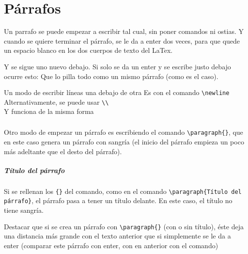 \chapter{Párrafos}

Un parrafo se puede empezar a escribir tal cual, sin poner comandos ni ostias. Y cuando se quiere terminar el párrafo, se le da a enter dos veces, para que quede un espacio blanco en los dos cuerpos de texto del LaTex.

Y se sigue uno nuevo debajo.
Si solo se da un enter y se escribe justo debajo ocurre esto:
Que lo pilla todo como un mismo párrafo (como es el caso).

Un modo de escribir líneas una debajo de otra \newline
Es con el comando \verb!\newline! \newline
Alternativamente, se puede usar \verb!\\! \\
Y funciona de la misma forma

\paragraph{}Otro modo de empezar un párrafo es escribiendo el comando \verb!\paragraph{}!, que en este caso genera un párrafo con sangría (el inicio del párrafo empieza un poco más adeltante que el desto del párrafo).

\paragraph{Título del párrafo}Si se rellenan los \verb!{}! del comando, como en el comando \verb!\paragraph{Título del párrafo}!, el párrafo pasa a tener un título delante. En este caso, el título no tiene sangría.

Destacar que si se crea un párrafo con \verb!\paragraph{}! (con o sin título), éste deja una distancia más grande con el texto anterior que si simplemente se le da a enter (comparar este párrafo con enter, con en anterior con el comando)